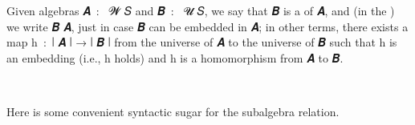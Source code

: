 \documentclass[a4paper,UKenglish,cleveref,autoref,thm-restate]{lipics-v2021}
\begin{document}
Given algebras \ab 𝑨~\as :~ \ab 𝓦 \ab 𝑆 and \ab 𝑩~\as :~ \ab 𝓤 \ab 𝑆, we say that \ab 𝑩 is a  of \ab 𝑨, and (in the \ualib) we write \af 𝑩  \ab 𝑨, just in case \ab 𝑩 can be embedded in \ab 𝑨; in other terms, there exists a map \ab h~\as :~\af ∣ \ab 𝑨 \af ∣ → \af ∣ 𝑩 \af ∣ from the universe of \ab 𝑨 to the universe of \ab 𝑩 such that \ab h is an embedding (i.e.,  \ab h holds) and \ab h is a homomorphism from \ab 𝑨 to \ab 𝑩.
\ccpad
\begin{code}%
\>[0]\AgdaSpace{}%
\AgdaSymbol{:}\AgdaSpace{}%
\AgdaSymbol{\{}\AgdaSpace{}%
\AgdaSpace{}%
\AgdaSymbol{:}\AgdaSpace{}%
\AgdaSymbol{\}(}\AgdaSpace{}%
\AgdaSymbol{:}\AgdaSpace{}%
\AgdaSpace{}%
\AgdaSpace{}%
\AgdaSymbol{)(}\AgdaSpace{}%
\AgdaSymbol{:}\AgdaSpace{}%
\AgdaSpace{}%
\AgdaSpace{}%
\AgdaSymbol{)}\AgdaSpace{}%
\AgdaSpace{}%
\AgdaSpace{}%
\AgdaSpace{}%
\AgdaSpace{}%
\AgdaSpace{}%
\AgdaSpace{}%
\AgdaSpace{}%
\AgdaSpace{}%
\<%
\\
\>[0]\AgdaSpace{}%
\AgdaSpace{}%
\AgdaSpace{}%
\AgdaSymbol{=}\AgdaSpace{}%
\AgdaSpace{}%
\AgdaSpace{}%
\AgdaSpace{}%
\AgdaSymbol{(}\AgdaSpace{}%
\AgdaSpace{}%
\AgdaSpace{}%
\AgdaSpace{}%
\AgdaSpace{}%
\AgdaSpace{}%
\AgdaSymbol{)}\AgdaSpace{}%
\AgdaFunction{,}\AgdaSpace{}%
\AgdaSpace{}%
\AgdaSpace{}%
\AgdaSpace{}%
\AgdaSpace{}%
\AgdaSpace{}%
\AgdaSpace{}%
\<
\end{code}
\ccpad
Here is some convenient syntactic sugar for the subalgebra relation.
\end{document}
